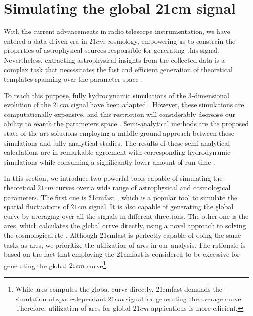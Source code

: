 \documentclass[12pt, TexShade, letterpaper]{report}
\begin{document}
\section{Simulating the global 21cm signal}
With the current advancements in radio telescope instrumentation, we have entered a data-driven era in $21cm$ cosmology, empowering us to constrain the properties of astrophysical sources responsible for generating this signal. Nevertheless, extracting astrophysical insights from the collected data is a complex task that necessitates the fast and efficient generation of theoretical templates spanning over the parameter space \cite{emulate_21cm}. \par
To reach this purpose, fully hydrodynamic simulations of the 3-dimensional evolution of the $21cm$ signal have been adapted \cite{hydrodynamic_sim}. However, these simulations are computationally expensive, and this restriction will considerably decrease our ability to search the parameters space \cite{ares2014jordan}. 
Semi-analytical methods are the proposed state-of-the-art solutions employing a middle-ground approach between these simulations and fully analytical studies. The results of these semi-analytical calculations are in remarkable agreement with corresponding hydrodynamic simulations while consuming a significantly lower amount of run-time \cite{semi_analytic_1, semi_analytic_2, semi_analytic_3, semi_analytic_4, semi-analytic_5}. \par
In this section, we introduce two powerful tools capable of simulating the theoretical $21cm$ curves over a wide range of astrophysical and cosmological parameters. The first one is \gls{21cmfast} \cite{21cmfast_c, 21cmfast_python}, which is a popular tool to simulate the spatial fluctuations of $21cm$ signal. It is also capable of generating the global curve by averaging over all the signals in different directions. The other one is the \gls{ares}, which calculates the global curve directly, using a novel approach to solving the cosmological \gls{rte} \cite{ares2014jordan}. Although \gls{21cmfast} is perfectly capable of doing the same tasks as \gls{ares}, we prioritize the utilization of \gls{ares} in our analysis. The rationale is based on the fact that employing the \gls{21cmfast} is considered to be excessive for generating the global $21cm$ curve\footnote{While \gls{ares} computes the global curve directly, \gls{21cmfast} demands the simulation of space-dependant 
 $21cm$ signal for generating the average curve. Therefore, utilization of \gls{ares} for global $21cm$ applications is more efficient.}.\par
\end{document}
